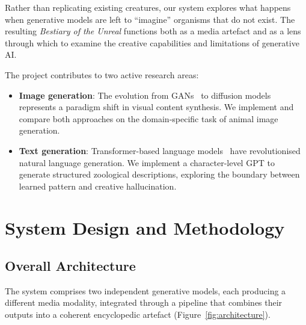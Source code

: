 \documentclass[12pt,a4paper]{article}
\begin{document}
Rather than replicating existing creatures, our system explores what happens when generative models are left to ``imagine'' organisms that do not exist. The resulting \emph{Bestiary of the Unreal} functions both as a media artefact and as a lens through which to examine the creative capabilities and limitations of generative AI.

The project contributes to two active research areas:
\begin{itemize}
    \item \textbf{Image generation}: The evolution from GANs~\cite{goodfellow2014generative} to diffusion models~\cite{ho2020denoising} represents a paradigm shift in visual content synthesis. We implement and compare both approaches on the domain-specific task of animal image generation.
    \item \textbf{Text generation}: Transformer-based language models~\cite{vaswani2017attention, radford2019language} have revolutionised natural language generation. We implement a character-level GPT to generate structured zoological descriptions, exploring the boundary between learned pattern and creative hallucination.
\end{itemize}

\section{System Design and Methodology}
\label{sec:system}

\subsection{Overall Architecture}

The system comprises two independent generative models, each producing a different media modality, integrated through a pipeline that combines their outputs into a coherent encyclopedic artefact (Figure~\ref{fig:architecture}).

\end{document}
